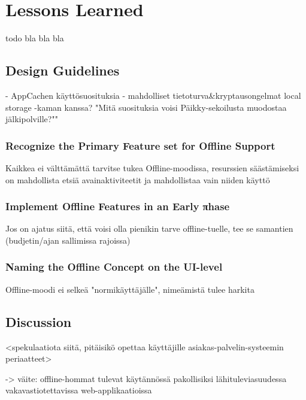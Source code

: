 \chapter{Lessons Learned}
todo bla bla bla



\section{Design Guidelines}
- AppCachen käyttösuosituksia
- mahdolliset tietoturva&kryptausongelmat local storage -kaman kanssa?
"Mitä suosituksia voisi Päikky-sekoilusta muodostaa jälkipolville?""

\subsection{Recognize the Primary Feature set for Offline Support}
Kaikkea ei välttämättä tarvitse tukea Offline-moodissa, resurssien säästämiseksi on mahdollista etsiä avainaktiviteetit ja mahdollistaa vain niiden käyttö


\subsection{Implement Offline Features in an Early πhase}
Jos on ajatus siitä, että voisi olla pienikin tarve offline-tuelle, tee se samantien (budjetin/ajan sallimissa rajoissa)

\subsection{Naming the Offline Concept on the UI-level}
Offline-moodi ei selkeä "normikäyttäjälle", nimeämistä tulee harkita



\section{Discussion}

<spekulaatiota siitä, pitäisikö opettaa käyttäjille asiakas-palvelin-systeemin periaatteet>


-> väite: offline-hommat tulevat käytännössä pakollisiksi lähituleviasuudessa vakavastiotettavissa web-applikaatioissa









